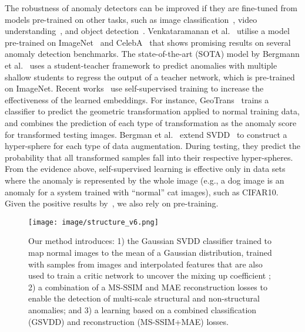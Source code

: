 \documentclass[final]{cvpr}
\begin{document}
The robustness of anomaly detectors can be improved if they are fine-tuned from models pre-trained on other tasks, such as image classification~\cite{venkataramanan2019attention,bergman2020classification}, video understanding~\cite{sultani2018real,tian2019one,Wu2020not,zhong2019graph}, and object detection~\cite{ionescu2019object}. 
Venkataramanan et al.~\cite{venkataramanan2019attention} utilise a model pre-trained on ImageNet~\cite{imagenet} and CelebA~\cite{liu2018large} that shows promising results on several anomaly detection benchmarks. 
The state-of-the-art (SOTA) model by Bergmann et al.~\cite{bergmann2020uninformed} uses a student-teacher framework to predict anomalies with multiple shallow students to regress the output of a teacher network, which is pre-trained on ImageNet. 
Recent works~\cite{golan2018deep,bergman2020classification} use self-supervised training to increase the effectiveness of the learned embeddings. For instance, GeoTrans~\cite{golan2018deep} trains a classifier to predict the geometric transformation applied to normal training data, and combines the prediction of each type of transformation as the anomaly score for transformed testing images. 
Bergman et al.~\cite{bergman2020classification} extend SVDD~\cite{dsvdd} to construct a hyper-sphere for each type of data augmentation. During testing, they predict the probability that all transformed samples fall into their respective hyper-spheres.  
From the evidence above, self-supervised learning is effective only in data sets where the anomaly is represented by the whole image (e.g., a dog image is an anomaly for a system trained with ``normal'' cat images), such as CIFAR10.
Given the positive results  by~\cite{golan2018deep,bergmann2020uninformed}, we also rely on pre-training.



\begin{figure*}[t!]
\begin{center}
\texttt{[image: image/structure\_v6.png]}
\end{center}
\caption{Our method introduces: 1) the Gaussian SVDD classifier trained to map normal images to the mean of a Gaussian distribution, trained with samples from images and interpolated features that are also used to train a critic network to uncover the mixing up coefficient ; 2) a combination of a MS-SSIM and MAE reconstruction losses to enable the detection of multi-scale structural and non-structural anomalies;
and 3) a learning based on a combined classification (GSVDD) and reconstruction (MS-SSIM+MAE) losses. 
}
\label{fig:train}
\end{figure*}
\end{document}
